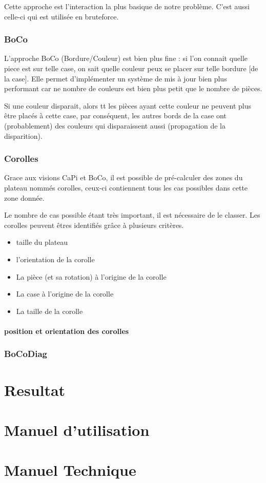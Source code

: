 \documentclass{article}
\begin{document}
	Cette approche est l'interaction la plus basique de notre problème. C'est aussi celle-ci qui est utilisée en bruteforce.
	
	\subsubsection{BoCo}
	
	L'approche BoCo (Bordure/Couleur) est bien plus fine : si l'on connait quelle piece est sur telle case, on sait quelle couleur peux se placer sur telle bordure [de la case]. Elle permet d'implémenter un système de mis à jour bien plus performant car ne nombre de couleurs est bien plus petit que le nombre de pièces. 
	
	\begin{exmp}
		Si une couleur disparait, alors tt les pièces ayant cette couleur ne peuvent plus être placés à cette case, par conséquent, les autres bords de la case ont (probablement) des couleurs qui disparaissent aussi (propagation de la disparition).
	\end{exmp}
	
	\subsubsection{Corolles}
	
	Grace aux visions CaPi et BoCo, il est possible de pré-calculer des zones du plateau nommés corolles, ceux-ci contiennent tous les cas possibles dans cette zone donnée.
	
	Le nombre de cas possible étant très important, il est nécessaire de le classer. Les corolles peuvent êtres identifiés grâce à plusieurs critères.
	
	\begin{itemize}
		\item taille du plateau
		\item l'orientation de la corolle
		\item La pièce (et sa rotation) à l'origine de la corolle
		\item La case à l'origine de la corolle
		\item La taille de la corolle
	\end{itemize}
	
	\paragraph{position et orientation des corolles}

	\subsubsection{BoCoDiag}
	
	\section{Resultat}
	
	\section{Manuel d'utilisation}
	
	\section{Manuel Technique}
\end{document}
